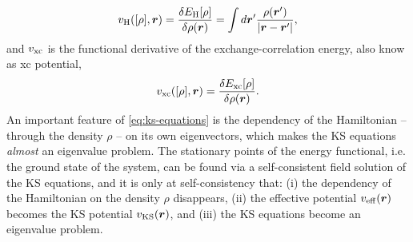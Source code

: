 %
\begin{equation}
    v_{\rm H}([\rho],{\bm r}) = \frac{\delta E_{\rm H}[\rho]}{\delta \rho({\bm r})} = \int d{\bm r}' \frac{\rho({\bm r}')}{|{\bm r} - {\bm r}'|} ,
    \label{eq:hartree-potential}
\end{equation}
%
and $v_{\rm xc}$ is the functional derivative of the exchange-correlation energy, also know as xc potential,
%
\begin{equation}
    v_{\rm xc}([\rho],{\bm r}) = \frac{\delta E_{\rm xc}[\rho]}{\delta \rho({\bm r})} .
    \label{eq:xc-potential}
\end{equation}
%
An important feature of \cref{eq:ks-equations} is the dependency of the Hamiltonian -- through the density $\rho$ -- on its own eigenvectors, which makes the KS equations \emph{almost} an eigenvalue problem. The stationary points of the energy functional, i.e. the ground state of the system, can be found via a self-consistent field solution of the KS equations, and it is only at self-consistency that: (i) the dependency of the Hamiltonian on the density $\rho$ disappears, (ii) the effective potential $v_{\rm eff}({\bm r})$ becomes the KS potential $v_{\rm KS}({\bm r})$, and (iii) the KS equations become an eigenvalue problem.

